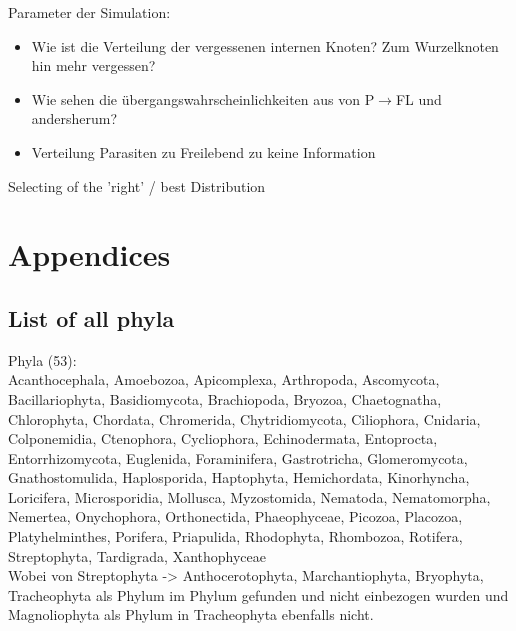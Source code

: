   Parameter der Simulation:
  \begin{itemize}
    \item Wie ist die Verteilung der vergessenen internen Knoten? Zum Wurzelknoten hin mehr vergessen?
    \item Wie sehen die übergangswahrscheinlichkeiten aus von P$\rightarrow$FL und andersherum?
    \item Verteilung Parasiten zu Freilebend zu keine Information
  \end{itemize}


  Selecting of the 'right'  / best Distribution
  


\chapter{Appendices}
  \section{List of all phyla}\label{sec:listPhyla}

  Phyla (53): \\
  Acanthocephala, Amoebozoa, Apicomplexa, Arthropoda, Ascomycota, Bacillariophyta, Basidiomycota, 
    Brachiopoda, Bryozoa, Chaetognatha, Chlorophyta, Chordata, Chromerida, Chytridiomycota, 
    Ciliophora, Cnidaria, Colponemidia, Ctenophora, Cycliophora, Echinodermata, Entoprocta, 
    Entorrhizomycota, Euglenida, Foraminifera, Gastrotricha, Glomeromycota, Gnathostomulida, 
    Haplosporida, Haptophyta, Hemichordata, Kinorhyncha, Loricifera, Microsporidia, Mollusca, 
    Myzostomida, Nematoda, Nematomorpha, Nemertea, Onychophora, Orthonectida, Phaeophyceae, 
    Picozoa, Placozoa, Platyhelminthes, Porifera, Priapulida, Rhodophyta, Rhombozoa, Rotifera, 
    Streptophyta, Tardigrada, Xanthophyceae \\
  Wobei von Streptophyta -> Anthocerotophyta, Marchantiophyta, Bryophyta, Tracheophyta als
    Phylum im Phylum gefunden und nicht einbezogen wurden und Magnoliophyta als Phylum in 
    Tracheophyta ebenfalls nicht. \\

